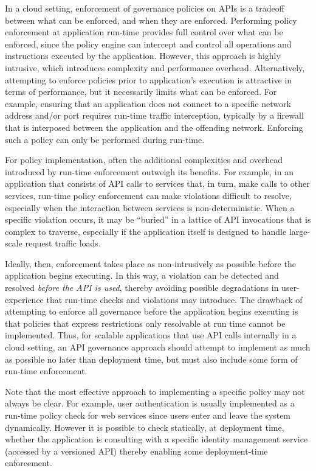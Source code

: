 In a cloud setting, enforcement of governance policies on APIs is a tradeoff between
what can be enforced, and when they are enforced. Performing policy enforcement
at application run-time provides full control over what can be enforced, since the policy 
engine can intercept and control all operations and instructions executed by the application.
However, this approach is highly intrusive, which introduces complexity and performance
overhead. Alternatively, attempting to enforce policies prior to application's execution is
attractive in terms of performance, but it necessarily limits what can 
be enforced. For example, ensuring that an
application does not connect to a specific network address and/or port
requires run-time traffic interception, typically by a firewall that is
interposed between the application and the offending network. Enforcing such a policy
can only be performed during run-time.

For policy implementation, often the additional complexities and overhead
introduced by run-time enforcement outweigh its benefits.  For example, in an
application that consists of API calls to services that, in turn, make calls
to other services, run-time policy enforcement can make violations difficult
to resolve, especially when the interaction between services is
non-deterministic.  When a specific violation occurs, it may be ``buried'' in a
lattice of API invocations that is complex to traverse, especially if the
application itself is designed to handle large-scale request traffic loads.

Ideally, then, enforcement takes place as non-intrusively as possible before
the application begins executing.  In this way, a violation can be detected and
resolved \textit{before the API is used}, thereby avoiding possible
degradations in user-experience that run-time checks and violations may
introduce.  The drawback of attempting to enforce all governance before the
application begins executing is that policies that express restrictions only
resolvable at run time cannot be implemented.  
Thus, for scalable applications that use API calls internally in a cloud
setting, an API governance approach should attempt to implement as much as
possible no later than deployment time, but must also include some form of
run-time enforcement.  

Note that the most effective approach to implementing a specific policy may not
always be clear.  For example, user authentication is usually implemented as a
run-time policy check for web services since users enter and leave the system dynamically.
However it is possible to check statically, at deployment time, whether the
application is consulting with a specific identity management service (accessed
by a versioned API) thereby enabling some deployment-time enforcement.

